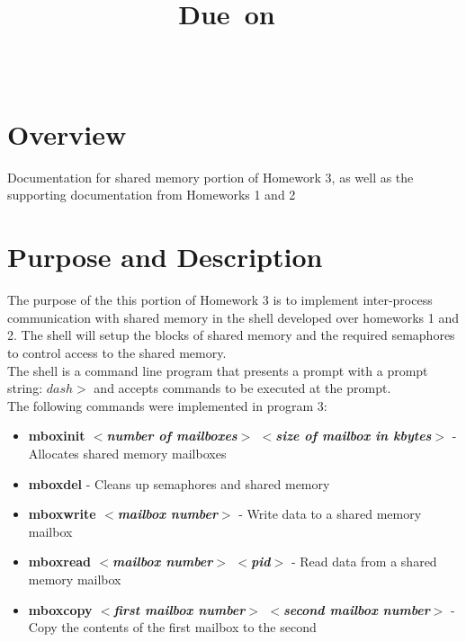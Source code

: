 \documentclass{article}
\title{
\vspace{2in}
\textmd{\textbf{\hmwkTitle}}\\
\hmwkClass\ \\
\vspace{1in}
\normalsize\vspace{0.1in}\small{Due\ on\ \hmwkDueDate}\\
\vspace{0.1in}\large{\textit{\hmwkClassInstructor\ \hmwkClassTime}}
\vspace{3in}
}
\author{\textbf{\hmwkAuthorName}}
\date{} %
\newcommand{\perlscript}[2]{
\begin{itemize}
\item[]
\end{itemize}
}
\begin{document}
\maketitle











\section{Overview}
Documentation for shared memory portion of Homework 3, as well as the supporting documentation from Homeworks 1 and 2

\section{Purpose and Description}
The purpose of the this portion of Homework 3 is to implement inter-process communication with shared memory in the shell developed over homeworks 1 and 2. The shell will setup the blocks of shared memory and the required semaphores to control access to the shared memory. \\

The shell is a command line program that presents a prompt with a prompt string: $dash>$ and accepts commands to be executed at the prompt.\\

The following commands were implemented in program 3:
\begin{itemize}
\item \textbf{mboxinit $<$\textit{number of mailboxes}$>$ $<$\textit{size of mailbox in kbytes}$>$} - Allocates shared memory mailboxes
\item \textbf{mboxdel} - Cleans up semaphores and shared memory
\item \textbf{mboxwrite $<$\textit{mailbox number}$>$} - Write data to a shared memory mailbox
\item \textbf{mboxread $<$\textit{mailbox number}$>$ $<$\textit{pid}$>$} - Read data from a shared memory mailbox
\item \textbf{mboxcopy $<$\textit{first mailbox number}$>$ $<$\textit{second mailbox number}$>$} - Copy the contents of the first mailbox to the second
\end{itemize}
\end{document}
